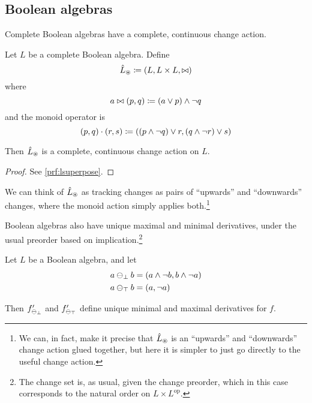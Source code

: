 \subsection{Boolean algebras}
\label{sec:booleanAlgebras}

Complete Boolean algebras have a complete, continuous change action.

\begin{prop}[name=Boolean algebra change actions, restate=lsuperpose]
 Let $L$ be a complete Boolean algebra. Define
  \begin{displaymath}
    \hat{L}_\circledast \coloneqq (L,L \times L,\bowtie)
  \end{displaymath}
  where
  \begin{displaymath}
    a \bowtie (p, q) \coloneqq (a \vee p) \wedge \neg q
  \end{displaymath}
  and the monoid operator is
  \begin{displaymath}
    (p, q) \cdot (r, s) \coloneqq ((p \wedge \neg q) \vee r, (q \wedge \neg r) \vee s)
  \end{displaymath}

  Then $\hat{L}_\circledast$ is a complete, continuous change action on $L$.
\end{prop}
\ifproofs
\begin{proof}
  See \cref{prf:lsuperpose}.
\end{proof}
\fi

We can think of $\hat{L}_\circledast$ as tracking changes as pairs of ``upwards'' and
``downwards'' changes, where the monoid action simply applies both.\footnote{We
  can, in fact, make it precise that $\hat{L}_\circledast$ is an ``upwards''
  and ``downwards'' change action glued together, but here it is simpler to
  just go directly to the useful change action.}  

Boolean algebras also have unique maximal and minimal
derivatives, under the usual preorder based on implication.\footnote{The change
set is, as usual, given the change preorder, which in this case corresponds to
the natural order on $L \times L^{\textrm{op}}$.}

\begin{prop}
  Let $L$ be a Boolean algebra, and let
  \begin{align*}
    a \ominus_\bot b &= (a \wedge \neg b, b \wedge \neg a)\\
    a \ominus_\top b &= (a, \neg a)
  \end{align*}

  Then $f'_{\ominus_{\bot}}$ and $f'_{\ominus_{\top}}$ 
  define unique minimal and maximal derivatives for $f$.
\end{prop}

